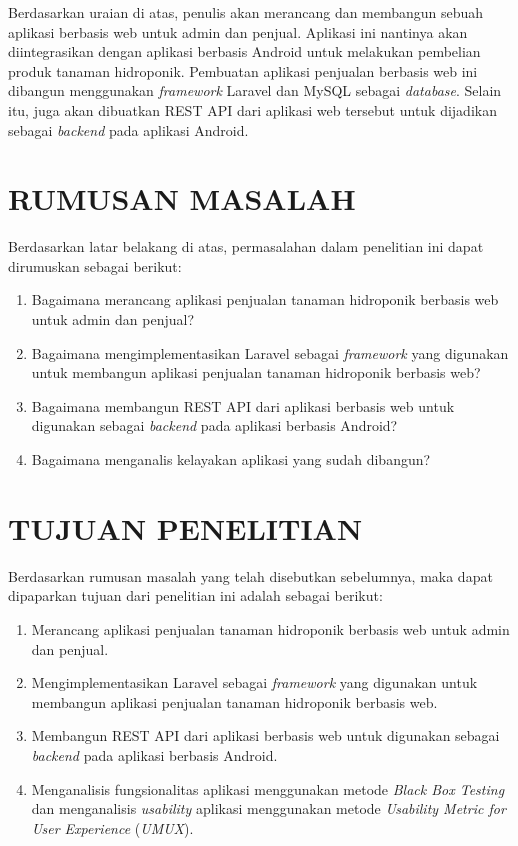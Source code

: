 \par Berdasarkan uraian di atas, penulis akan merancang dan membangun sebuah aplikasi berbasis web untuk admin dan penjual. Aplikasi ini nantinya akan diintegrasikan dengan aplikasi berbasis Android untuk melakukan pembelian produk tanaman hidroponik. Pembuatan aplikasi penjualan berbasis web ini dibangun menggunakan \textit{framework} Laravel dan MySQL sebagai \textit{database}. Selain itu, juga akan dibuatkan REST API dari aplikasi web tersebut untuk dijadikan sebagai \textit{backend} pada aplikasi Android.

\fancyhf{} 
\fancyfoot[R]{\thepage}

\section{\uppercase{RUMUSAN MASALAH}}
Berdasarkan latar belakang di atas, permasalahan dalam penelitian ini dapat dirumuskan sebagai berikut:
\begin{enumerate}
	\item Bagaimana merancang aplikasi penjualan tanaman hidroponik berbasis web untuk admin dan penjual?
	\item Bagaimana mengimplementasikan Laravel sebagai \textit{framework} yang digunakan untuk membangun aplikasi penjualan tanaman hidroponik berbasis web?
	\item Bagaimana membangun REST API dari aplikasi berbasis web untuk digunakan sebagai \textit{backend}  pada aplikasi berbasis Android?
	\item Bagaimana menganalis kelayakan aplikasi yang sudah dibangun?
\end{enumerate}

\section{\uppercase{TUJUAN PENELITIAN}}
Berdasarkan rumusan masalah yang telah disebutkan sebelumnya, maka dapat dipaparkan tujuan dari penelitian ini adalah sebagai berikut:
\begin{enumerate}
	\item Merancang aplikasi penjualan tanaman hidroponik berbasis web untuk admin dan penjual.
	\item Mengimplementasikan Laravel sebagai \textit{framework} yang digunakan untuk membangun aplikasi penjualan tanaman hidroponik berbasis web.
	\item Membangun REST API dari aplikasi berbasis web untuk digunakan sebagai \textit{backend} pada aplikasi berbasis Android.
	\item  Menganalisis fungsionalitas aplikasi menggunakan metode \textit{Black Box Testing} dan menganalisis \textit{usability} aplikasi menggunakan metode \textit{Usability Metric for User Experience} (\textit{UMUX}).
\end{enumerate}


